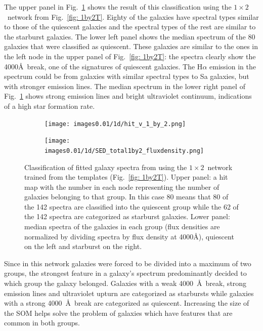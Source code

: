          
            
            The upper panel in Fig.~\ref{fig: 1by2V} shows the result of this classification using the $1\times2$~network from Fig.~\ref{fig: 1by2T}.
            Eighty of the galaxies have spectral types similar to those of the quiescent galaxies and the spectral types of the rest are similar to the starburst galaxies.
            The lower left panel shows the median spectrum of the 80 galaxies that were classified as quiescent. 
            These galaxies are similar to the ones in the left node in the upper panel of Fig.~\ref{fig: 1by2T}:
            the spectra clearly show the 4000\AA~break, one of the signatures of quiescent galaxies.
            The H$\alpha$ emission in the spectrum could be from galaxies with similar spectral types to Sa galaxies, but with stronger emission lines.
            The median spectrum in the lower right panel of Fig.~\ref{fig: 1by2V} shows strong emission lines and bright ultraviolet continuum, indications of a high star formation rate.
            \begin{figure}
                \begin{subfigure}[b]{0.45\textwidth}
                    \centering
                    \texttt{[image: images0.01/1d/hit\_v\_1\_by\_2.png]}
                \end{subfigure}
                \hfill
                \begin{subfigure}[b]{0.45\textwidth}
                     \texttt{[image: images0.01/1d/SED\_total1by2\_fluxdensity.png]}
                \end{subfigure}
                \caption{Classification of fitted galaxy spectra from \citet{Hossein12} using the $1\times2$~network trained from the \citet{Kinney96} templates (Fig.~\ref{fig: 1by2T}). Upper panel: a hit map with the number in each node representing the number of galaxies belonging to that group. In this case 80 means that 80 of the 142 spectra are classified into the quiescent group while the 62 of the 142 spectra are categorized as starburst galaxies. Lower panel: median spectra of the galaxies in each group (flux densities are normalized by dividing spectra by flux density at 4000\AA), quiescent on the left and starburst on the right.}
                \label{fig: 1by2V}
            \end{figure}          
            
            Since in this network galaxies were forced to be divided into a maximum of two groups, the strongest feature in a galaxy's spectrum predominantly decided to which group the galaxy belonged.
            Galaxies with a weak 4000~\AA~break, strong emission lines and ultraviolet upturn are categorized as starbursts while galaxies with a strong 4000~\AA~break are categorized as quiescent.
            Increasing the size of the SOM helps solve the problem of galaxies which have features that are common in both groups.
            
